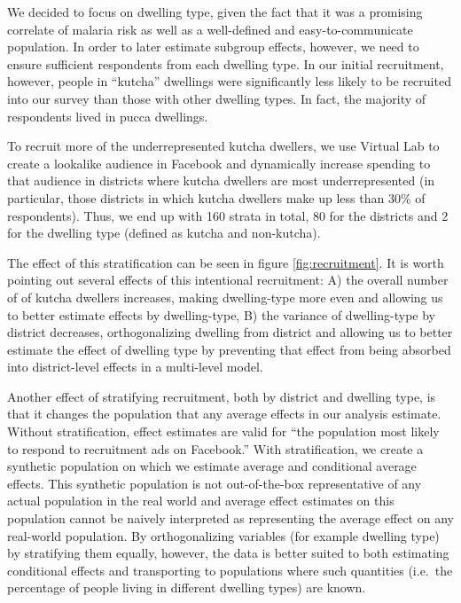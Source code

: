 \documentclass[a4paper,12pt]{article}
\theoremstyle{proposition}
\begin{document}
We decided to focus on dwelling type, given the fact that it was a promising correlate of malaria risk as well as a well-defined and easy-to-communicate population. In order to later estimate subgroup effects, however, we need to ensure sufficient respondents from each dwelling type. In our initial recruitment, however, people in ``kutcha'' dwellings were significantly less likely to be recruited into our survey than those with other dwelling types. In fact, the majority of respondents lived in pucca dwellings.

To recruit more of the underrepresented kutcha dwellers, we use Virtual Lab to create a lookalike audience in Facebook and dynamically increase spending to that audience in districts where kutcha dwellers are most underrepresented (in particular, those districts in which kutcha dwellers make up less than 30\% of respondents). Thus, we end up with 160 strata in total, 80 for the districts and 2 for the dwelling type (defined as kutcha and non-kutcha).

The effect of this stratification can be seen in figure \ref{fig:recruitment}. It is worth pointing out several effects of this intentional recruitment: A) the overall number of of kutcha dwellers increases, making dwelling-type more even and allowing us to better estimate effects by dwelling-type, B) the variance of dwelling-type by district decreases, orthogonalizing dwelling from district and allowing us to better estimate the effect of dwelling type by preventing that effect from being absorbed into district-level effects in a multi-level model.

Another effect of stratifying recruitment, both by district and dwelling type, is that it changes the population that any average effects in our analysis estimate. Without stratification, effect estimates are valid for ``the population most likely to respond to recruitment ads on Facebook.'' With stratification, we create a synthetic population on which we estimate average and conditional average effects. This synthetic population is not out-of-the-box representative of any actual population in the real world and average effect estimates on this population cannot be naively interpreted as representing the average effect on any real-world population. By orthogonalizing variables (for example dwelling type) by stratifying them equally, however, the data is better suited to both estimating conditional effects and transporting to populations where such quantities (i.e.\ the percentage of people living in different dwelling types) are known.
\end{document}
